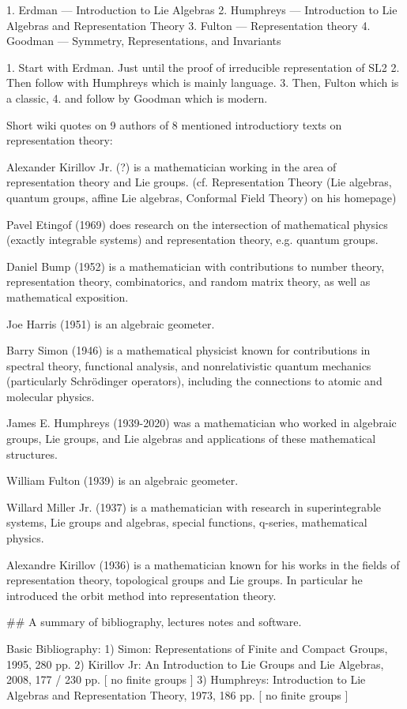1. Erdman — Introduction to Lie Algebras
2. Humphreys — Introduction to Lie Algebras and Representation Theory
3. Fulton — Representation theory
4. Goodman — Symmetry, Representations, and Invariants

1. Start with Erdman. Just until the proof of irreducible representation of SL2
2. Then follow with Humphreys which is mainly language.
3. Then, Fulton which is a classic,
4. and follow by Goodman which is modern.



Short wiki quotes on 9 authors of 8 mentioned introductiory texts on
representation theory:

Alexander Kirillov Jr. (?) is a mathematician working in the area of
representation theory and Lie groups. (cf. Representation Theory (Lie algebras,
quantum groups, affine Lie algebras, Conformal Field Theory) on his homepage)

Pavel Etingof (1969) does research on the intersection of mathematical physics
(exactly integrable systems) and representation theory, e.g. quantum groups.

Daniel Bump (1952) is a mathematician with contributions to number theory,
representation theory, combinatorics, and random matrix theory, as well as
mathematical exposition.

Joe Harris (1951) is an algebraic geometer.

Barry Simon (1946) is a mathematical physicist known for contributions in
spectral theory, functional analysis, and nonrelativistic quantum mechanics
(particularly Schrödinger operators), including the connections to atomic and
molecular physics.

James E. Humphreys (1939-2020) was a mathematician who worked in algebraic
groups, Lie groups, and Lie algebras and applications of these mathematical
structures.

William Fulton (1939) is an algebraic geometer.

Willard Miller Jr. (1937) is a mathematician with research in superintegrable
systems, Lie groups and algebras, special functions, q-series, mathematical
physics.

Alexandre Kirillov (1936) is a mathematician known for his works in the fields
of representation theory, topological groups and Lie groups. In particular he
introduced the orbit method into representation theory.


##
A summary of bibliography, lectures notes and software.

Basic Bibliography:
1) Simon: Representations of Finite and Compact Groups, 1995, 280 pp.
2) Kirillov Jr: An Introduction to Lie Groups and Lie Algebras, 2008, 177 / 230 pp. [ no finite groups ]
3) Humphreys: Introduction to Lie Algebras and Representation Theory, 1973, 186 pp. [ no finite groups ]

